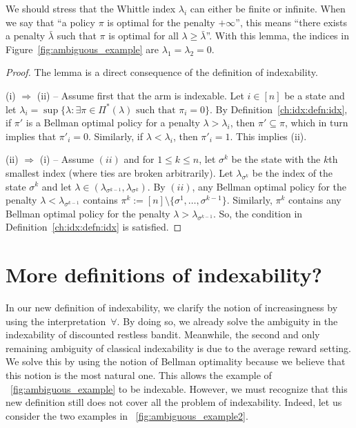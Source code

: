 We should stress that the Whittle index $\lambda_i$ can either be finite or infinite. When we say that ``a policy $\pi$ is optimal for the penalty $+\infty$'', this means ``there exists a penalty $\bar{\lambda}$ such that $\pi$ is optimal for all $\lambda\ge\bar{\lambda}$''.
With this lemma, the indices in Figure~\ref{fig:ambiguous_example} are $\lambda_1=\lambda_2=0$.

\begin{proof}
    The lemma is a direct consequence of the definition of indexability.

    (i) $\Rightarrow$ (ii) -- Assume first that the arm is indexable.
    Let $i\in[n]$ be a state and let $\lambda_i=\sup\{\lambda : \exists\pi\in\Pi^*(\lambda)\text{ such that }\pi_i=0\}$.
    By Definition~\ref{ch:idx:defn:idx}, if $\pi'$ is a Bellman optimal policy for a penalty $\lambda>\lambda_i$, then $\pi'\subseteq\pi$, which in turn implies that $\pi'_i=0$.
    Similarly, if $\lambda<\lambda_i$, then $\pi'_i=1$. This implies (ii).

    (ii) $\Rightarrow$ (i) -- Assume $(ii)$ and for $1\le k\le n$, let $\sigma^k$ be the state with the $k$th smallest index (where ties are broken arbitrarily).
    Let $\lambda_{\sigma^k}$ be the index of the state $\sigma^k$ and let $\lambda\in(\lambda_{\sigma^{k-1}}, \lambda_{\sigma^k})$. 
    By $(ii)$, any Bellman optimal policy for the penalty $\lambda<\lambda_{\sigma^{k-1}}$ contains $\pi^{k}:=[n]\setminus\{\sigma^1,\dots, \sigma^{k-1}\}$. Similarly, $\pi^{k}$ contains any Bellman optimal policy for the penalty $\lambda>\lambda_{\sigma^{k-1}}$.
    So, the condition in Definition~\ref{ch:idx:defn:idx} is satisfied.
\end{proof}

\section{More definitions of indexability?}
\label{ch:idx:sec:more_defn}

In our new definition of indexability, we clarify the notion of increasingness by using the interpretation~$\forall$.
By doing so, we already solve the ambiguity in the indexability of discounted restless bandit.
Meanwhile, the second and only remaining ambiguity of classical indexability is due to the average reward setting.
We solve this by using the notion of Bellman optimality because we believe that this notion is the most natural one.
This allows the example of \figurename~\ref{fig:ambiguous_example} to be indexable.
However, we must recognize that this new definition still does not cover all the problem of indexability.
Indeed, let us consider the two examples in \figurename~\ref{fig:ambiguous_example2}.

